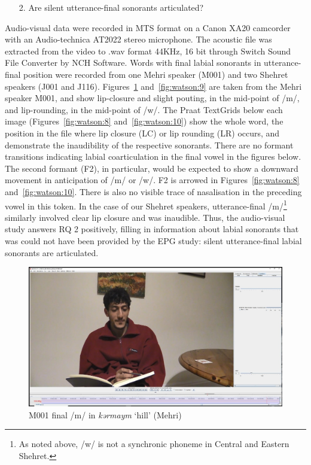 \documentclass[output=paper]{langscibook}
\begin{document}
\begin{enumerate}
  \item[2.] {Are silent utterance-final sonorants articulated?}
\end{enumerate}

Audio-visual data were recorded in MTS format on a Canon XA20 camcorder with an Audio-technica AT2022 stereo microphone. The acoustic file was extracted from the video to .wav format 44KHz, 16 bit through Switch Sound File Converter by NCH Software. Words with final labial sonorants in utterance-final position were recorded from one Mehri speaker (M001) and two Shehret speakers (J001 and J116). Figures~\ref{fig:watson:7} and~\ref{fig:watson:9} are taken from the Mehri speaker M001, and show lip-closure and slight pouting, in the mid-point of \mbox{/m/}, and lip-rounding, in the mid-point of \mbox{/w/}. The Praat TextGrids below each image (Figures~\ref{fig:watson:8} and~\ref{fig:watson:10}) show the whole word, the position in the file where lip closure (LC) or lip rounding (LR) occurs, and demonstrate the inaudibility of the respective sonorants. There are no formant transitions indicating labial coarticulation in the final vowel in the figures below. The second formant (F2), in particular, would be expected to show a downward movement in anticipation of \mbox{/m/} or \mbox{/w/}. F2 is arrowed in Figures~\ref{fig:watson:8} and~\ref{fig:watson:10}. There is also no visible trace of nasalisation in the preceding vowel in this token. In the case of our Shehret speakers, utterance-final \mbox{/m/}\footnote{As noted above, \mbox{/w/} is not a synchronic phoneme in Central and Eastern Shehret.} similarly involved clear lip closure and was inaudible. Thus, the audio-visual study answers RQ 2 positively, filling in information about labial sonorants that was could not have been provided by the EPG study: silent utterance-final labial sonorants are articulated.

 \begin{figure}[p]
\includegraphics[width=\textwidth]{figures/a12Watsonetal-img007.jpg}
 \caption{M001 final /m/ in \textit{kərmaym} ‘hill’ (Mehri)}
\label{fig:watson:7}
\end{figure}
\end{document}
